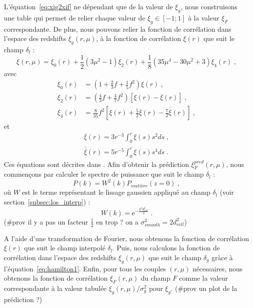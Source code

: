 \documentclass[11pt, twoside, a4paper, openright]{report}
\begin{document}
L'équation~\ref{eq:xig2xif} ne dépendant que de la valeur de $\xi_g$, nous construisons une table qui permet de relier chaque valeur de $\xi_g \in [-1 ; 1]$ à la valeur $\xi_F$ correspondante.
De plus, nous pouvons relier la fonction de corrélation dans l'espace des redshifts $\xi_g(r, \mu)$, à la fonction de corrélation $\xi(r)$ que suit le champ $\delta_l$ :
\begin{equation}
  \label{eq:hamilton1}
  \xi(r, \mu) = \xi_0(r) + \frac{1}{2}\left(3 \mu^2 - 1\right) \xi_2(r) + \frac{1}{8}\left(35 \mu^4 - 30 \mu^2 + 3\right) \xi_4(r) \; ,
\end{equation}
avec
\begin{align}
  \label{eq:hamilton2}
  \xi_0(r) &= \left(1 + \frac{2}{3} f + \frac{1}{5} f^2\right) \xi(r) \; , \\
  \xi_2(r) &= \left(\frac{4}{3} f + \frac{4}{7} f^2\right) \left[\xi(r) - \overline \xi(r)\right] \; , \\
  \xi_4(r) &= \frac{8}{35} f^2\left[\xi(r) + \frac{5}{2} \overline \xi(r) - \frac{7}{2} \overline{\overline \xi}(r)\right] \; ,
\end{align}
et
\begin{align}
  \label{eq:hamilton3}
  \overline \xi(r) = 3 r^{-3} \int_0^r \xi(s) s^2 ds \; , \\
  \overline{\overline \xi}(r) = 5 r^{-5} \int_0^r \xi(s) s^4 ds \; .
\end{align}
Ces équations sont décrites dans \citet{hamilton_measuring_1992}.
Afin d'obtenir la prédiction $\xi_F^{pred}(r, \mu)$, nous commençons par calculer  le spectre de puissance que suit le champ $\delta_l$ :
\begin{equation}
  P(k) = W^2(k)P_{matière}(z=0) \; ,
\end{equation}
où $W$ est le terme représentant le lissage gaussien appliqué au champ $\delta_l$ (voir section~\ref{subsec:los_interp}) :
\begin{equation}
  W(k) = \mathrm{e}^{- \frac{k^2 d_{cell}^2}{2}} \;.
\end{equation}
(\#prov il y a pas un facteur $\frac{1}{2}$ en trop ? on a $\sigma_{smooth}^2 = 2 d_{cell}^2$)

A l'aide d'une transformation de Fourier, nous obtenons la fonction de corrélation $\xi(r)$ que suit le champ interpolé $\delta_l$.
Puis, nous calculons la fonction de corrélation dans l'espace des redshifts $\xi_g(r, \mu)$ que suit le champ $\delta_g$ gràce à l'équation~\ref{eq:hamilton1}. Enfin, pour tous les couples $(r,\mu)$ nécessaires, nous obtenons la fonction de corrélation $\xi_F(r, \mu)$ du champ $F$ comme la valeur correspondante à la valeur tabulée $\xi_g(r, \mu) / \sigma_g^2$ pour $\xi_g$.
(\#prov un plot de la prédiction ?)
\end{document}
